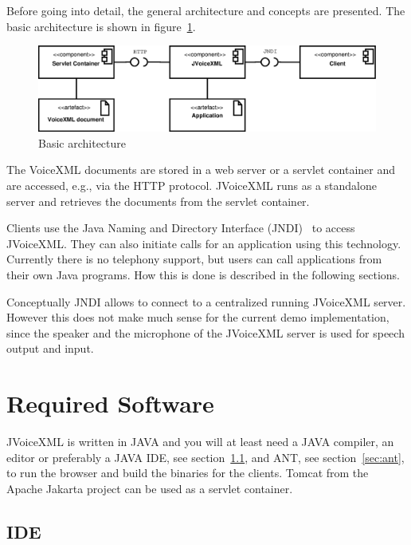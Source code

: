 \documentclass[11pt,a4paper]{article}
\begin{document}
Before going into detail, the general architecture and concepts are presented.
The basic architecture is shown in figure~\ref{fig:architecture}.

\begin{figure}
\label{fig:architecture}
\caption{Basic architecture}
\begin{center}
\includegraphics[scale=0.3]{architecture.eps}
\end{center}
\end{figure}

The VoiceXML documents are stored in a web server or a servlet container
and are accessed, e.g., via the HTTP protocol.
JVoiceXML runs as a standalone server and retrieves the documents from
the servlet container. 

Clients use the Java Naming and Directory Interface (JNDI)~\cite{sun:jndi} to 
access JVoiceXML. They can also initiate calls for an application using this 
technology. Currently there is no telephony support, but users can call 
applications from their own Java programs. How this is done is described in the 
following sections.

Conceptually JNDI allows to connect to a centralized running JVoice\-XML 
server. However this does not make much sense for the current demo 
implementation, since the speaker and the microphone of the JVoiceXML server
is used for speech output and input.

\section{Required Software}
\label{sec:required-software}

JVoiceXML is written in JAVA and you will at least need a JAVA compiler, an 
editor or preferably a JAVA IDE, see section~\ref{sec:ide}, and ANT, see 
section~\ref{sec:ant}, to run the browser and build the binaries for the 
clients. Tomcat from the Apache Jakarta project can be used as a servlet
container.

\subsection{IDE}
\label{sec:ide}
\end{document}
